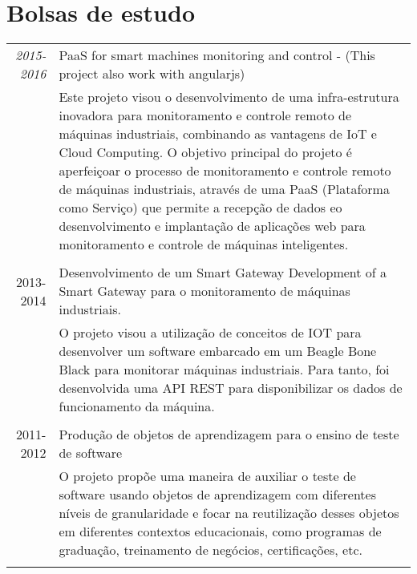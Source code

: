 \documentclass[a4paper,10pt]{article}
\begin{document}
\section{Bolsas de estudo}
\begin{tabular}{r|p{11cm}}

\emph{2015-2016} & PaaS for smart machines monitoring and control - (This project also work with angularjs)\\
&\footnotesize{Este projeto visou o desenvolvimento de uma infra-estrutura inovadora para monitoramento e controle remoto de máquinas industriais, combinando as vantagens de IoT e Cloud Computing. O objetivo principal do projeto é aperfeiçoar o processo de monitoramento e controle remoto de máquinas industriais, através de uma PaaS (Plataforma como Serviço) que permite a recepção de dados eo desenvolvimento e implantação de aplicações web para monitoramento e controle de máquinas inteligentes.} \\\multicolumn{2}{c}{} \\

\textsc{2013-2014} & Desenvolvimento de um Smart Gateway Development of a Smart Gateway para o monitoramento de máquinas industriais.\\
&\footnotesize{O projeto visou a utilização de conceitos de IOT para desenvolver um software embarcado em um Beagle Bone Black para monitorar máquinas industriais. Para tanto, foi desenvolvida uma API REST para disponibilizar os dados de funcionamento da máquina.}\\\multicolumn{2}{c}{} \\

\textsc{2011-2012} & Produção de objetos de aprendizagem para o ensino de teste de software\\
&\footnotesize{O projeto propõe uma maneira de auxiliar o teste de software usando objetos de aprendizagem com diferentes níveis de granularidade e focar na reutilização desses objetos em diferentes contextos educacionais, como programas de graduação, treinamento de negócios, certificações, etc.}\\\multicolumn{2}{c}{} \\

\end{tabular}

\end{document}
